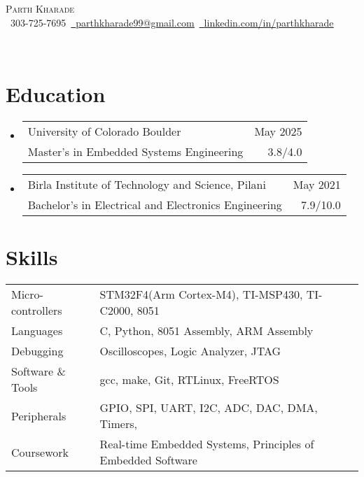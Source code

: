 \documentclass[11pt]{article}
\makeatletter
\newcommand{\resumeSubheadingEdu}[4]{
  \vspace{-2pt}\item
    \begin{tabular*}{1.0\textwidth}[t]{l@{\extracolsep{\fill}}r}
       {\large #1}&{\large #2} \\
       {#3} &{ #4} \\
    \end{tabular*}\vspace{-1pt}
}
\newcommand{\resumeSubHeadingListStart}{\begin{itemize}[leftmargin=0.0in, label={}]}
\newcommand{\resumeSubHeadingListEnd}{\end{itemize}}
\makeatother
\begin{document}
\setlength{\footskip}{4pt}
\begin{center}
  {\huge \scshape Parth Kharade} \\ \vspace{1pt}
  \small \raisebox{-0.1\height}\faPhone\ 303-725-7695{\hspace{0.1cm}}~\href{mailto:parthkharade99@gmail.com}{\raisebox{-0.2\height}\faEnvelope\ \underline{parthkharade99@gmail.com}}~{\hspace{0.1cm}}\href{https://www.linkedin.com/in/parth-k-081287184/}{\raisebox{-0.2\height}\faLinkedin\ \underline{linkedin.com/in/parthkharade}}
  \vspace{-10pt}
\end{center}


\
\section {Education}
\resumeSubHeadingListStart
\resumeSubheadingEdu
{University of Colorado Boulder}{May 2025}
{Master's in Embedded Systems Engineering}{3.8/4.0}
\vspace{-0.1in}
\resumeSubheadingEdu
{Birla Institute of Technology and Science, Pilani}{May 2021}
{Bachelor's in Electrical and Electronics Engineering}{7.9/10.0}
\resumeSubHeadingListEnd

\section{Skills}
\vspace{-4mm}
\begin{table}[!htb]
  \begin{tabular} { m{3.1cm} | m{15cm} }
    {Micro-controllers}   & {\: STM32F4(Arm Cortex-M4), TI-MSP430, TI-C2000, 8051}                  \\
    {Languages}           & {\: C, Python, 8051 Assembly, ARM Assembly}  \\
    {Debugging}           & {\: Oscilloscopes, Logic Analyzer, JTAG}\\
    {Software \& Tools}   & {\: gcc, make, Git, RTLinux, FreeRTOS}     \\
    {Peripherals}         & {\: GPIO, SPI, UART, I2C, ADC, DAC, DMA, Timers, }                 \\
    {Coursework}          & {\: Real-time Embedded Systems, Principles of Embedded Software}\\
  \end{tabular}
\end{table}
\vspace{-16pt}
\end{document}
